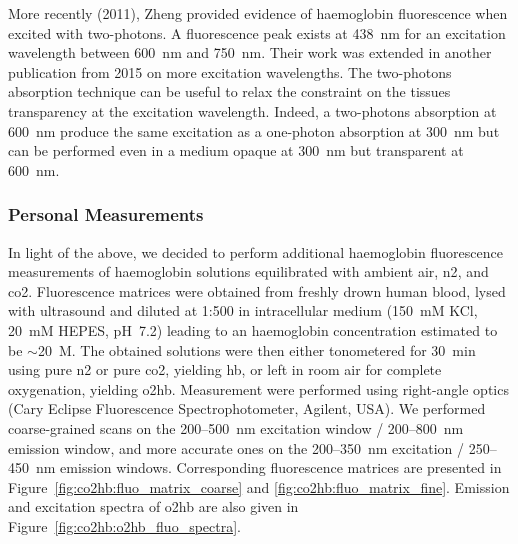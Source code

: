More recently (2011), Zheng \etal{}\cite{zheng2011} provided evidence of haemoglobin fluorescence when excited with two-photons. A fluorescence peak exists at 438~nm for an excitation wavelength between 600~nm and 750~nm. Their work was extended in another publication from 2015\cite{sun2015} on more excitation wavelengths. The two-photons absorption technique can be useful to relax the constraint on the tissues transparency at the excitation wavelength. Indeed, a two-photons absorption at 600~nm produce the same excitation as a one-photon absorption at 300~nm but can be performed even in a medium opaque at 300~nm but transparent at 600~nm.

\subsubsection{Personal Measurements}

In light of the above, we decided to perform additional haemoglobin fluorescence measurements of haemoglobin solutions equilibrated with ambient air, \gls{n2}, and \gls{co2}. Fluorescence matrices were obtained from freshly drown human blood, lysed with ultrasound and diluted at 1:500 in intracellular medium (150~mM KCl, 20~mM HEPES, pH~7.2) leading to an haemoglobin concentration estimated to be $\sim$20~\textmu{}M. The obtained solutions were then either tonometered for 30~min using pure \gls{n2} or pure \gls{co2}, yielding \gls{hb}, or left in room air for complete oxygenation, yielding \gls{o2hb}. Measurement were performed using right-angle optics (Cary Eclipse Fluorescence Spectrophotometer, Agilent, USA). We performed coarse-grained scans on the 200--500~nm excitation window / 200--800~nm emission window, and more accurate ones on the 200--350~nm excitation / 250--450~nm emission windows. Corresponding fluorescence matrices are presented in Figure~\ref{fig:co2hb:fluo_matrix_coarse} and \ref{fig:co2hb:fluo_matrix_fine}. Emission and excitation spectra of \gls{o2hb} are also given in Figure~\ref{fig:co2hb:o2hb_fluo_spectra}.


